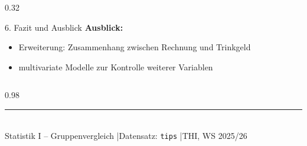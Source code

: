 \documentclass[final]{beamer}
\begin{document}
\begin{frame}[t]
\begin{columns}[T,totalwidth=\textwidth]
\begin{column}{0.32\textwidth}
\begin{block}{6. Fazit und Ausblick}
    \textbf{Ausblick:}
    \begin{itemize}
      \item Erweiterung: Zusammenhang zwischen Rechnung und Trinkgeld
      \item multivariate Modelle zur Kontrolle weiterer Variablen
    \end{itemize}

  \end{block}
\end{column}

\end{columns}

\begin{columns}[T]
  \begin{column}{0.98\textwidth}
    \begin{center}
      \rule{\textwidth}{1pt}\\[0.35cm]
      {\small Statistik I – Gruppenvergleich \quad|\quad Datensatz: \texttt{tips} \quad|\quad THI, WS 2025/26}
    \end{center}
  \end{column}
\end{columns}

\end{frame}
\end{document}
